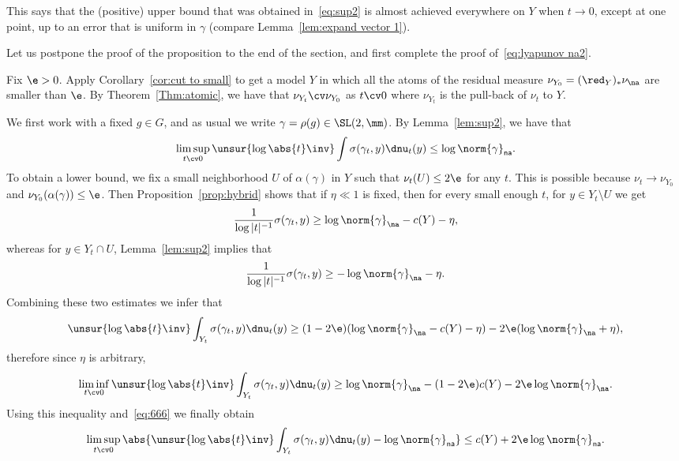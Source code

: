 This says that the (positive) upper bound that was obtained in~\eqref{eq:sup2} is almost achieved everywhere on $Y$ when $t\to0$, except at one point, up to an error that is uniform in $\gamma$ (compare Lemma~\ref{lem:expand vector 1}).

Let us postpone the proof of the proposition to the end of the section, and first complete the proof of~\eqref{eq:lyapunov na2}.

Fix $\e>0$. Apply Corollary~\ref{cor:cut to small} to get a model $Y$ in which all the atoms of the residual measure $\nu_{Y_0}= (\red_Y)_* \nu_\na$ are smaller than $\e$. By Theorem~\ref{Thm:atomic}, we have that $\nu_{Y_t}\cv \nu_{Y_0}$ as $t\cv 0$ where $\nu_{Y_t}$ is the pull-back of $\nu_t$ to $Y$.

We first work with a fixed $g\in G$, and as usual we write $\gamma = \rho(g) \in \SL(2,\mm)$. By Lemma~\ref{lem:sup2}, we have that
\begin{equation}\label{eq:666}
\limsup_{t\cv0} \unsur{\log\abs{t }\inv} \int \sigma(\gamma_t, y) \dnu_t(y) \leq \log \norm{\gamma}_{\sf na}.
\end{equation}
To obtain a lower bound, we fix a small neighborhood $U$ of $\alpha(\gamma)$ in $Y$ such that $\nu_t(U) \le 2 \e$ for any $t$. This is possible because $\nu_t \to \nu_{Y_0}$ and $\nu_{Y_0}(\alpha(\gamma)) \le \e$. Then Proposition~\ref{prop:hybrid} shows that if $\eta \ll 1$ is fixed, then for every small enough $t$, for $y\in Y_t\setminus U$ we get
\[
\frac{1}{\log|t|^{-1}} \sigma(\gamma_t, y)
\ge \log \norm{\gamma}_\na - c(Y) - \eta,
\]
whereas for $y\in Y_t \cap U$, Lemma~\ref{lem:sup2} implies that
\[
\frac{1}{\log|t|^{-1}} \sigma(\gamma_t, y)
\ge - \log \norm{\gamma}_\na -\eta.
\]
Combining these two estimates we infer that
\[
\unsur{\log\abs{t }\inv} \int_{Y_t} \sigma(\gamma_t, y) \dnu_t(y) \geq
(1-2\e) (\log \norm{\gamma}_\na - c(Y) - \eta) - 2\e (\log \norm{\gamma}_\na +\eta)
,
\]
therefore since $\eta$ is arbitrary,
\[
\liminf_{t\cv0}\unsur{\log\abs{t }\inv} \int_{Y_t} \sigma(\gamma_t, y) \dnu_t(y) \geq \log \norm{\gamma}_\na - (1-2\e)c(Y) - 2\e \log \norm{\gamma}_\na.
\]
Using this inequality and~\eqref{eq:666} we finally obtain
\begin{equation}\label{eq:limsupinf}
\limsup_{t\cv0} \abs{ \unsur{\log\abs{t }\inv} \int_{Y_t} \sigma(\gamma_t, y) \dnu_t(y) - \log\norm{\gamma}_{\sf na}} \leq c(Y) + 2\e \log \norm{\gamma}_{\sf na}.
\end{equation}

